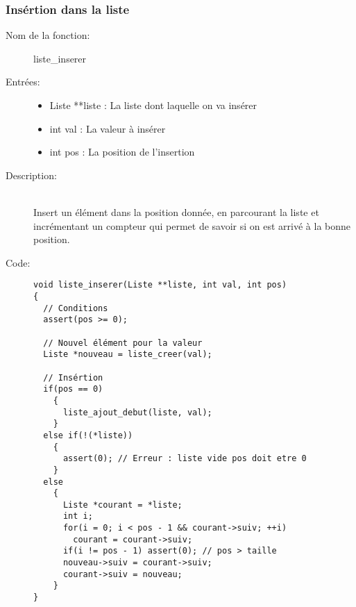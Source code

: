 \documentclass[a4paper]{article}
\begin{document}
\subsubsection{Insértion dans la liste}
\begin{description}
  \item[Nom de la fonction:] liste\_inserer

  \item[Entrées:] \hfill
    \begin{itemize}
      \item Liste **liste : La liste dont laquelle on va insérer
      \item int val : La valeur à insérer
      \item int pos : La position de l'insertion
    \end{itemize}

  \item[Description:] \hfill \\ 
    Insert un élément dans la position donnée, en parcourant la liste et incrémentant
    un compteur qui permet de savoir si on est arrivé à la bonne position.
    
  \item[Code:] \hfill 
  \begin{lstlisting}
void liste_inserer(Liste **liste, int val, int pos)
{
  // Conditions
  assert(pos >= 0);

  // Nouvel élément pour la valeur
  Liste *nouveau = liste_creer(val);

  // Insértion
  if(pos == 0)
    {
      liste_ajout_debut(liste, val);
    }
  else if(!(*liste))
    {
      assert(0); // Erreur : liste vide pos doit etre 0
    }
  else
    {
      Liste *courant = *liste;
      int i;
      for(i = 0; i < pos - 1 && courant->suiv; ++i)
        courant = courant->suiv;
      if(i != pos - 1) assert(0); // pos > taille
      nouveau->suiv = courant->suiv;
      courant->suiv = nouveau;
    }
}
  \end{lstlisting}
\end{description}
\end{document}
